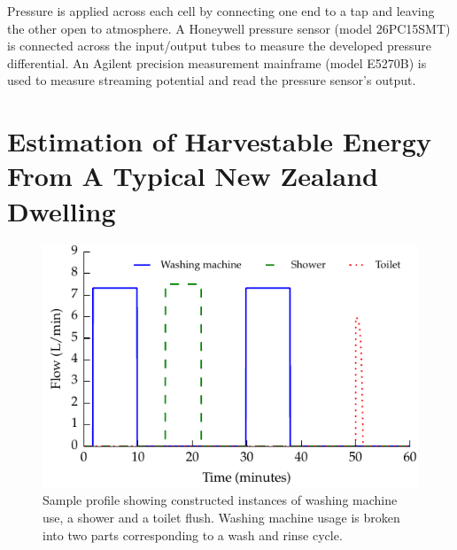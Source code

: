 \documentclass[10pt,final,journal]{IEEEtran}
\begin{document}
    Pressure is applied across each cell by connecting one end to a tap and leaving the other open to atmosphere.
    A Honeywell pressure sensor (model 26PC15SMT) is connected across the input/output tubes to measure the developed pressure differential.
    An Agilent precision measurement mainframe (model E5270B) is used to measure streaming potential and read the pressure sensor's output.

    \section{Estimation of Harvestable Energy From A Typical New Zealand Dwelling}
    \label{sect:waterConsumption}
    \begin{figure}
        \begin{center}
        \includegraphics[width=\linewidth]{graph_profile.pdf}
        \end{center}
        \caption{Sample profile showing constructed instances of washing machine use, a shower and a toilet flush.
        Washing machine usage is broken into two parts corresponding to a wash and rinse cycle.}
        \label{fig:profileSample}
    \end{figure}
\end{document}
